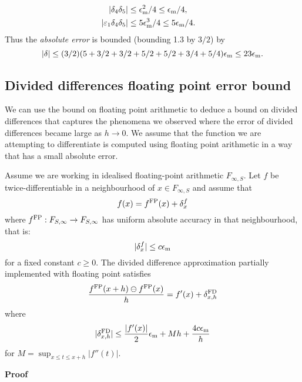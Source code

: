 \begin{example}
\begin{align*}
|\ensuremath{\delta}_4 \ensuremath{\delta}_5| &\ensuremath{\leq}  \ensuremath{\epsilon}_{\rm m}^2/4  \ensuremath{\leq} \ensuremath{\epsilon}_{\rm m}/4, \cr
|\ensuremath{\varepsilon}_1\ensuremath{\delta}_4\ensuremath{\delta}_5| &\ensuremath{\leq} 5\ensuremath{\epsilon}_{\rm m}^3/4 \ensuremath{\leq} 5\ensuremath{\epsilon}_{\rm m}/4.
\end{align*}
Thus the \emph{absolute error} is bounded (bounding 1.3 by $3/2$) by
\[
|\ensuremath{\delta}| \ensuremath{\leq} (3/2) (5 +  3/2 + 3/2 + 5/2 + 5/2 + 3/4 + 5/4) \ensuremath{\epsilon}_{\rm m} \ensuremath{\leq} 23 \ensuremath{\epsilon}_{\rm m}.
\]
\end{example}

\subsection{Divided differences floating point error bound}
We can use the bound on floating point arithmetic to deduce a bound on divided differences that captures the phenomena we observed where the error of divided differences became large as $h \ensuremath{\rightarrow} 0$. We assume that the function we are attempting to differentiate is computed using floating point arithmetic in a way that has a small absolute error.

\begin{theorem} Assume we are working in idealised floating-point arithmetic $F_{\ensuremath{\infty},S}$. Let $f$ be twice-differentiable in a neighbourhood of $x \ensuremath{\in} F_{\ensuremath{\infty},S}$ and assume that
\[
 f(x) = f^{\rm FP}(x) + \ensuremath{\delta}_x^f
\]
where $f^{\rm FP} : F_{S,\ensuremath{\infty}} \ensuremath{\rightarrow} F_{S,\ensuremath{\infty}}$ has uniform absolute accuracy in that neighbourhood, that is:
\[
|\ensuremath{\delta}_x^f| \ensuremath{\leq} c \ensuremath{\epsilon}_{\rm m}
\]
for a fixed constant $c \ensuremath{\geq} 0$. The divided difference approximation partially implemented with floating point satisfies
\[
{f^{\rm FP}(x + h) \ensuremath{\ominus} f^{\rm FP}(x) \over h} = f'(x) + \ensuremath{\delta}_{x,h}^{\rm FD}
\]
where
\[
|\ensuremath{\delta}_{x,h}^{\rm FD}| \ensuremath{\leq} {|f'(x)| \over 2} \ensuremath{\epsilon}_{\rm m} + M h +  {4c \ensuremath{\epsilon}_{\rm m} \over h}
\]
for $M = \sup_{x \ensuremath{\leq} t \ensuremath{\leq} x+h} |f''(t)|$.

\end{theorem}
\textbf{Proof}


